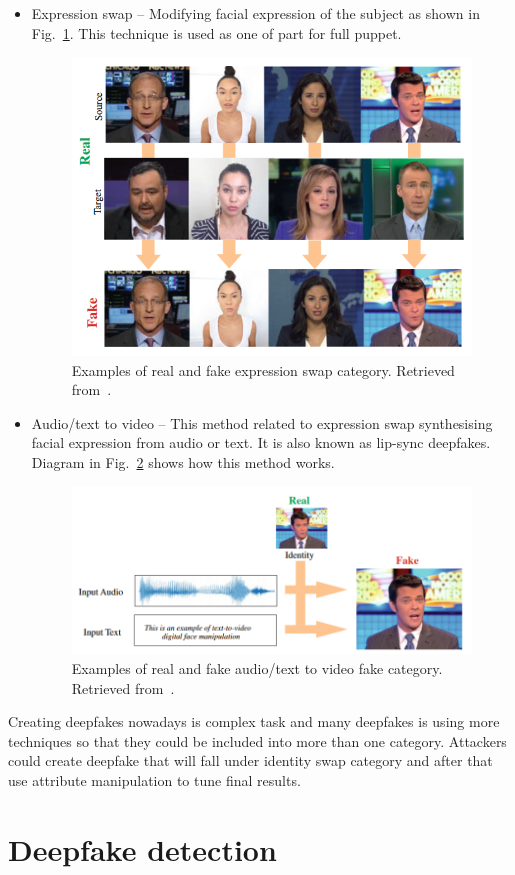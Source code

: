 \begin{itemize}
\item Expression swap – Modifying facial expression of the subject as shown in Fig.~\ref{fig:expression_swap}. This technique is used as one of part for full puppet.
\begin{figure}[H]
    \centering
    \includegraphics[width=.52\linewidth]{other-fig/expression_swap.png}
    \caption{Examples of real and fake expression swap category. Retrieved from~\cite{IntroductionToDigitalFaceManipulation}.}
\label{fig:expression_swap}
\end{figure}

\item Audio/text to video – This method related to expression swap synthesising facial expression from audio or text. It is also known as lip-sync deepfakes. Diagram in Fig.~\ref{fig:audio_to_video} shows how this method works.
\begin{figure}[H]
    \centering
    \includegraphics[width=.6\linewidth]{other-fig/audio_to_video.png}
    \caption{Examples of real and fake audio/text to video fake category. Retrieved from~\cite{IntroductionToDigitalFaceManipulation}.}
\label{fig:audio_to_video}
\end{figure}
\end{itemize}

Creating deepfakes nowadays is complex task and many deepfakes is using more techniques so that they could be included into more than one category. Attackers could create deepfake that will fall under identity swap category and after that use attribute manipulation to tune final results.

\chapter{Deepfake detection}
\label{chapter:deepfake_detectoin}

